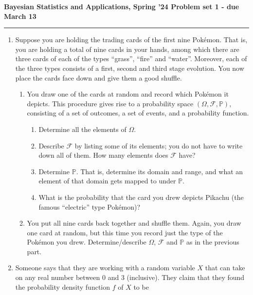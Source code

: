 \documentclass[12pt, reqno]{amsart}
\title{}
\author{}
\date{}
\newcommand{\Pe}{\mathbb{P}}
\newcommand{\Eff}{\mathcal{F}}
\theoremstyle{remark}
\begin{document}
\vspace*{-0.5in}
\centering
\textbf{Bayesian Statistics and Applications, Spring '24 \hfill Problem set 1 - due March 13}

\rule[0.5ex]{1\columnwidth}{0.5pt}
\raggedright


\justifying
\begin{enumerate}
     \item\label{exc:pokemon} Suppose you are holding the trading cards of the first nine Pokémon. That is, you are holding a total of nine cards in your hands, among which there are three cards of each of the types ``grass'', ``fire'' and ``water''. Moreover, each of the three types consists of a first, second and third stage evolution. You now place the cards face down and give them a good shuffle.
     \begin{enumerate}
          \item\label{exc:pokemon_a} You draw one of the cards at random and record which Pokémon it depicts. This procedure gives rise to a probability space \((\Omega, \Eff, \Pe)\), consisting of a set of outcomes, a set of events, and a probability function.
               \begin{enumerate}
                    \item Determine all the elements of \(\Omega\).
                    \item Describe \(\Eff\) by listing some of its elements; you do not have to write down all of them. How many elements does \(\Eff\) have?
                    \item Determine \(\Pe\). That is, determine its domain and range, and what an element of that domain gets mapped to under \(\Pe\).
                    \item What is the probability that the card you drew depicts Pikachu (the famous ``electric'' type Pokémon)?
               \end{enumerate}
          \item\label{exc:pokemon_b} You put all nine cards back together and shuffle them. Again, you draw one card at random, but this time you record just the type of the Pokémon you drew. Determine/describe \(\Omega\), \(\Eff\) and \(\Pe\) as in the previous part.
     \end{enumerate}
     \item\label{exc:pdf} Someone says that they are working with a random variable \(X\) that can take on any real number between \(0\) and \(3\) (inclusive). They claim that they found the probability density function \(f\) of \(X\) to be \[
\]
\end{enumerate}
\end{document}
